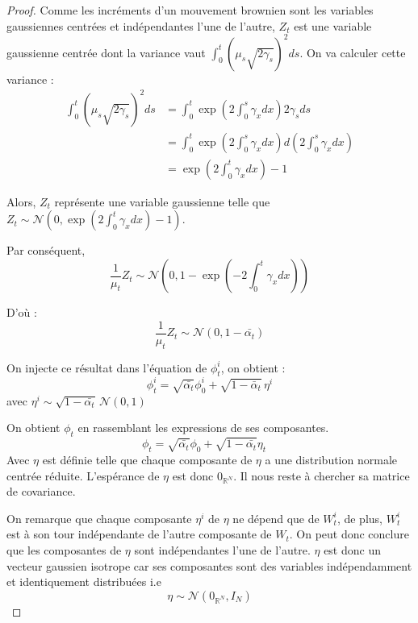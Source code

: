 \documentclass[a4paper,10pt]{article}
\theoremstyle{definition} %
\theoremstyle{definition} %
\theoremstyle{definition} %
\theoremstyle{definition} %
\newcommand{\R}{\mathbb{R}}
\begin{document}
\begin{proof}
    Comme les incréments d'un mouvement brownien sont les variables gaussiennes centrées et indépendantes l'une de l'autre, $Z_t$ est une variable gaussienne centrée dont la variance vaut $\int_0^t(\mu_s\sqrt{2\gamma_s})^2 ds $. On va calculer cette variance :
    \begin{align*}
        \int_0^t(\mu_s\sqrt{2\gamma_s})^2ds &= \int_0^t \exp\left(2 \int_0^s \gamma_xdx\right) 2 \gamma_s ds \\ 
        &=\int_0^t \exp\left(2 \int_0^s \gamma_xdx\right) d\left(2 \int_0^s \gamma_xdx\right)\\
        &= \exp\left(2 \int_0^t \gamma_xdx\right) -1
    \end{align*}
    
    Alors, $Z_t$ représente une variable gaussienne telle que  $Z_t \sim \mathcal{N}\left(0, \exp\left(2 \int_0^t \gamma_xdx\right) -1\right) $.
    
    Par conséquent, 
    \[\frac{1}{\mu_t}Z_t \sim \mathcal{N}\left(0, 1-\exp\left(-2 \int_0^t \gamma_xdx\right)\right)\]
    
    D'où :
    \[\frac{1}{\mu_t}Z_t \sim \mathcal{N}\left(0, 1-\bar{\alpha_t}\right)\]

    On injecte ce résultat dans l'équation de $\phi_t^i$, on obtient :
    \[\phi_t^i = \sqrt{\bar{\alpha_t}}\phi_0^i + \sqrt{1-\bar \alpha_t}\,\eta^i\]
    avec $\eta^i \sim \sqrt{1-\bar{\alpha_t}}\,\mathcal{N}\left(0, 1\right)$

    On obtient $\phi_t$ en rassemblant les expressions de ses composantes. 
    \[\phi_t = \sqrt{\bar{\alpha_t}}\phi_0 + \sqrt{1-\bar{\alpha_t}}\eta_t \quad \] 
    Avec $\eta$ est définie telle que chaque composante de $\eta$ a une distribution normale centrée réduite. L'espérance de $\eta$ est donc $0_{\R^N}$. Il nous reste à chercher sa matrice de covariance.

    On remarque  que chaque composante $\eta^i$ de $\eta$ ne dépend que de $W_t^i$, de plus, $W_t^i$ est à son tour indépendante de l'autre composante de $W_t$. On peut donc conclure que les composantes de $\eta$ sont indépendantes l'une de l'autre. $\eta$ est donc un vecteur gaussien isotrope car ses composantes sont des variables indépendamment et identiquement distribuées i.e
    \[\eta \sim \mathcal{N}(0_{\R^N},I_N)\]
\end{proof}
\end{document}

